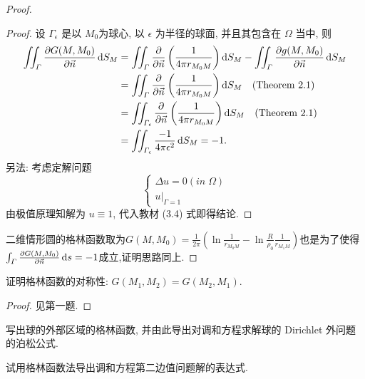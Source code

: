 \begin{proof}
  \begin{proof}
    设 $\varGamma_{\epsilon}$ 是以 $M_0$为球心,
    以 $\epsilon$ 为半径的球面, 并且其包含在 $\varOmega$ 当中, 则
    \[\begin{split}
      \iint_{\varGamma}\frac{\partial G(M,M_0)}{\partial\vec{n}}\mathop{}\!\mathrm{d} S_M
      & = \iint_{\varGamma}\frac{\partial}{\partial\vec{n}}\left(\frac{1}{4\pi r_{M_0M}}\right)\mathop{}\!\mathrm{d} S_M-\iint_{\varGamma}\frac{\partial g(M,M_0)}{\partial\vec{n}}\mathop{}\!\mathrm{d} S_M \\
      & = \iint_{\varGamma}\frac{\partial}{\partial\vec{n}}
          \left(\frac{1}{4\pi r_{M_0M}}\right)\mathop{}\!\mathrm{d} S_M\quad (\text{Theorem 2.1}) \\
      & = \iint_{\varGamma_{\epsilon}}\frac{\partial}{\partial\vec{n}}
          \left(\frac{1}{4\pi r_{M_0M}}\right)\mathop{}\!\mathrm{d} S_M\quad (\text{Theorem 2.1}) \\
      & = \iint_{\varGamma_{\epsilon}}\frac{-1}{4\pi\epsilon^2}\mathop{}\!\mathrm{d} S_M = -1.
    \end{split}\]
    另法: 考虑定解问题
    \[\begin{cases}
    \Delta u=0(in\;\varOmega)\\u|_{\varGamma=1}
    \end{cases}\]
    由极值原理知解为 $u\equiv1$, 代入教材 (3.4) 式即得结论.
  \end{proof}

  二维情形圆的格林函数取为$G(M,M_0)=\frac{1}{2\pi}\left(\ln\frac{1}{r_{M_0M}}-\ln\frac{R}{\rho_0}\frac{1}{r_{M_1M}}\right)$也是为了使得$\int_{\varGamma}\frac{\partial G(M,M_0)}{\partial\vec{n}}\mathop{}\!\mathrm{d} s=-1$成立,证明思路同上.
\end{proof}


\begin{exercise}
  证明格林函数的对称性: $G(M_1,M_2) = G(M_2,M_1)$.
\end{exercise}

\begin{proof}
  见第一题.
\end{proof}


\begin{exercise}
  写出球的外部区域的格林函数, 并由此导出对调和方程求解球的 Dirichlet 外问题的泊松公式.
\end{exercise}


\begin{exercise}
  试用格林函数法导出调和方程第二边值问题解的表达式.
\end{exercise}


